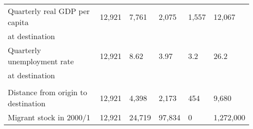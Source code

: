\begin{table}[htbp]
\begin{tabularx}{\textwidth}{l YYYYY }
\\
[0.3em]
Quarterly real GDP per capita  & 12,921 & 7,761 & 2,075 & 1,557 & 12,067  \\
at destination  & & & &  &   \\
[0.3em]
Quarterly unemployment rate & 12,921 & 8.62 & 3.97 & 3.2 & 26.2   \\
at destination  & & & &  &   \\
[0.3em]
\\
Distance from origin to destination & 12,921 & 4,398 & 2,173 & 454 & 9,680  \\
[0.3em]
Migrant stock in 2000/1 & 12,921 & 24,719 & 97,834 & 0 & 1,272,000  \\

\hline\end{tabularx}
\end{table}

